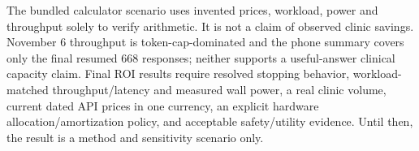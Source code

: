 \documentclass[11pt,a4paper]{article}
\begin{document}
The bundled calculator scenario uses invented prices, workload, power and throughput solely to verify arithmetic. It is not a claim of observed clinic savings. November 6 throughput is token-cap-dominated and the phone summary covers only the final resumed 668 responses; neither supports a useful-answer clinical capacity claim. Final ROI results require resolved stopping behavior, workload-matched throughput/latency and measured wall power, a real clinic volume, current dated API prices in one currency, an explicit hardware allocation/amortization policy, and acceptable safety/utility evidence. Until then, the result is a method and sensitivity scenario only.
\end{document}
